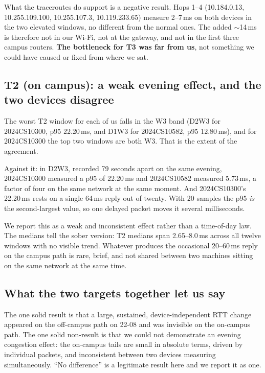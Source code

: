 What the traceroutes do support is a negative result. Hops 1--4 (10.184.0.13, 10.255.109.100,
10.255.107.3, 10.119.233.65) measure 2--7\,ms on both devices in the two elevated windows, no
different from the normal ones. The added $\sim$14\,ms is therefore not in our Wi-Fi, not at the
gateway, and not in the first three campus routers. \textbf{The bottleneck for T3 was far from
us}, not something we could have caused or fixed from where we sat.

\subsection{T2 (on campus): a weak evening effect, and the two devices disagree}

The worst T2 window for each of us falls in the W3 band (D2W3 for 2024CS10300, p95 22.20\,ms,
and D1W3 for 2024CS10582, p95 12.80\,ms), and for 2024CS10300 the top two windows are both W3.
That is the extent of the agreement.

Against it: in D2W3, recorded 79 seconds apart on the same evening, 2024CS10300 measured a p95
of 22.20\,ms and 2024CS10582 measured 5.73\,ms, a factor of four on the same network at the
same moment. And 2024CS10300's 22.20\,ms rests on a single 64\,ms reply out of twenty. With 20
samples the p95 \emph{is} the second-largest value, so one delayed packet moves it several
milliseconds.

We report this as a weak and inconsistent effect rather than a time-of-day law. The medians tell
the sober version: T2 medians span 2.65--8.0\,ms across all twelve windows with no visible trend.
Whatever produces the occasional 20--60\,ms reply on the campus path is rare, brief, and not
shared between two machines sitting on the same network at the same time.

\subsection{What the two targets together let us say}

The one solid result is that a large, sustained, device-independent RTT change appeared on the
off-campus path on 22-08 and was invisible on the on-campus path. The one solid non-result is
that we could not demonstrate an evening congestion effect: the on-campus tails are small in
absolute terms, driven by individual packets, and inconsistent between two devices measuring
simultaneously. ``No difference'' is a legitimate result here and we report it as one.

